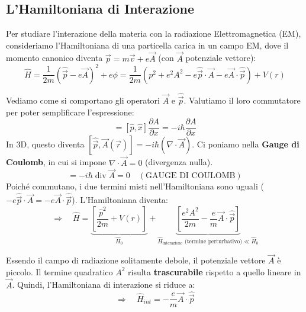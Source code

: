 \documentclass[11pt, a4paper]{article}
\begin{document}
\subsection{L'Hamiltoniana di Interazione} %

Per studiare l'interazione della materia con la radiazione Elettromagnetica (EM), consideriamo l'Hamiltoniana di una particella carica in un campo EM, dove il momento canonico diventa $\vec{p} = m\vec{v} + e\vec{A}$ (con $\vec{A}$ potenziale vettore): %
\begin{equation}
    \hat{H} = \frac{1}{2m} (\hat{\vec{p}} - e\vec{A})^2 + e\phi = \frac{1}{2m} (p^2 + e^2 A^2 - e\hat{\vec{p}}\cdot\vec{A} - e\vec{A}\cdot\hat{\vec{p}}) + V(r) %
\end{equation}

\noindent
Vediamo come si comportano gli operatori $\vec{A}$ e $\hat{\vec{p}}$. Valutiamo il loro commutatore per poter semplificare l'espressione: %
\begin{equation*}
    [\hat{p}, A(x)] = [\hat{p}, \hat{x}] \frac{\partial A}{\partial x} = -i\hbar \frac{\partial A}{\partial x} %
\end{equation*}
In 3D, questo diventa $[\hat{\vec{p}}, \vec{A}(\vec{r})] = -i\hbar (\nabla \cdot \vec{A})$. %
Ci poniamo nella \textbf{Gauge di Coulomb}, in cui si impone $\nabla \cdot \vec{A} = 0$ (divergenza nulla). %
\begin{equation*}
    [\hat{\vec{p}}, \vec{A}(\vec{r})] = -i\hbar \operatorname{div}\vec{A} = 0 \quad (\text{GAUGE DI COULOMB}) %
\end{equation*}
Poiché commutano, i due termini misti nell'Hamiltoniana sono uguali ($-e\hat{\vec{p}}\cdot\vec{A} = -e\vec{A}\cdot\hat{\vec{p}}$). L'Hamiltoniana diventa: %
\begin{equation}
    \Rightarrow \quad \hat{H} = \underbrace{ \left[ \frac{\hat{p}^2}{2m} + V(r) \right] }_{\hat{H}_0} + \underbrace{ \left[ \frac{e^2 A^2}{2m} - \frac{e}{m} \vec{A} \cdot \hat{\vec{p}} \right] }_{\hat{H}_{\text{interazione}} \text{ (termine perturbativo)} \ll \hat{H}_0} %
\end{equation}

\noindent
Essendo il campo di radiazione solitamente debole, il potenziale vettore $\vec{A}$ è piccolo. Il termine quadratico $A^2$ risulta \textbf{trascurabile} rispetto a quello lineare in $\vec{A}$. %
Quindi, l'Hamiltoniana di interazione si riduce a: %
\begin{equation}
    \Rightarrow \quad \hat{H}_{int} = - \frac{e}{m} \vec{A} \cdot \hat{\vec{p}} %
\end{equation}
\end{document}
